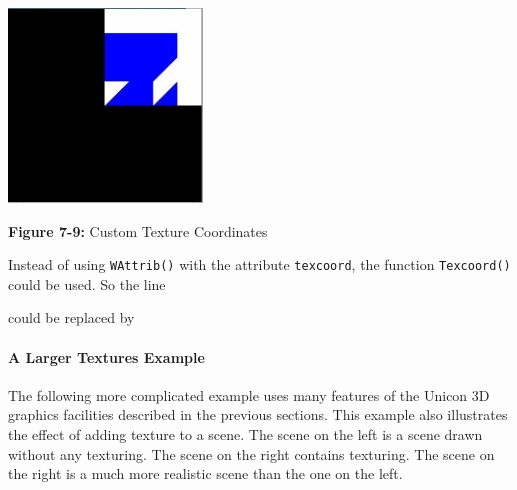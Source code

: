 \bigskip

{\centering 
\includegraphics[width=2.0307in,height=2.0311in]{ub-img/ub-img40.jpg}
\par}

{\sffamily\bfseries Figure 7-9:}
{\sffamily Custom Texture Coordinates}

\bigskip


Instead of using \texttt{WAttrib()} with the attribute \texttt{texcoord},
the function \texttt{Texcoord()} could be used. So the line 


\noindent
could be replaced by 


\paragraph[A Larger Textures Example]{A Larger Textures Example}
The following more complicated example uses many features of
the Unicon 3D graphics facilities described in the previous sections.
This example also illustrates the effect of adding texture to a scene.
The scene on the left is a scene drawn without any texturing.
The scene on the right contains texturing. The scene on the right is a
much more realistic scene than the one on the left. 

